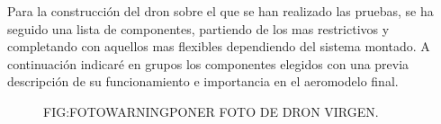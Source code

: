 
 Para la construcción del dron sobre el que se han realizado las pruebas, se ha seguido una lista de componentes, partiendo de los mas restrictivos y completando con aquellos mas flexibles dependiendo del sistema montado.
 A continuación indicaré en grupos los componentes elegidos con una previa descripción de su funcionamiento e importancia en el aeromodelo final.
 
  \begin{figure}{FIG:FOTOWARNING}{PONER FOTO DE DRON VIRGEN.}
\end{figure}